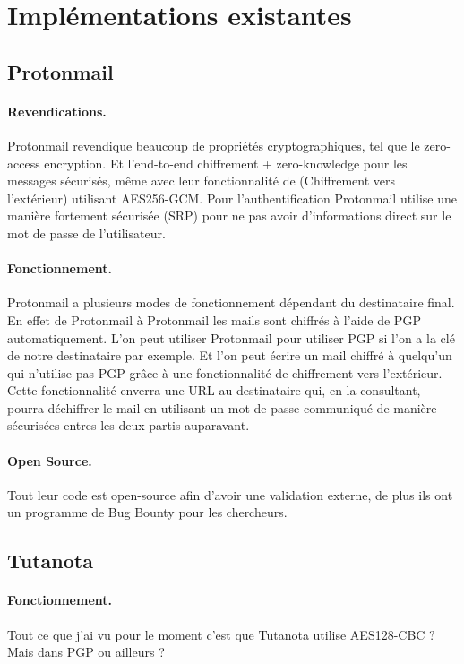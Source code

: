\section{Implémentations existantes}
\subsection{Protonmail}
\paragraph*{Revendications.}
Protonmail revendique beaucoup de propriétés cryptographiques, tel que le zero-access encryption. Et l’end-to-end chiffrement + zero-knowledge pour les messages sécurisés, même avec leur fonctionnalité de (Chiffrement vers l'extérieur) utilisant AES256-GCM. 
Pour l'authentification Protonmail utilise une manière fortement sécurisée (SRP) pour ne pas avoir d'informations direct sur le mot de passe de l'utilisateur.
\paragraph*{Fonctionnement.}
Protonmail a plusieurs modes de fonctionnement dépendant du destinataire final. En effet de Protonmail à Protonmail les mails sont chiffrés à l'aide de PGP automatiquement. L'on peut utiliser Protonmail pour utiliser PGP si l'on a la clé de notre destinataire par exemple. Et l'on peut écrire un mail chiffré à quelqu'un qui n'utilise pas PGP grâce à une fonctionnalité de chiffrement vers l'extérieur.
Cette fonctionnalité enverra une URL au destinataire qui, en la consultant, pourra déchiffrer le mail en utilisant un mot de passe communiqué de manière sécurisées entres les deux partis auparavant.
\paragraph*{Open Source.}
Tout leur code est open-source afin d'avoir une validation externe, de plus ils ont un programme de Bug Bounty pour les chercheurs.
\subsection{Tutanota}
\paragraph*{Fonctionnement.}
Tout ce que j'ai vu pour le moment c'est que Tutanota utilise AES128-CBC ? Mais dans PGP ou ailleurs ?
